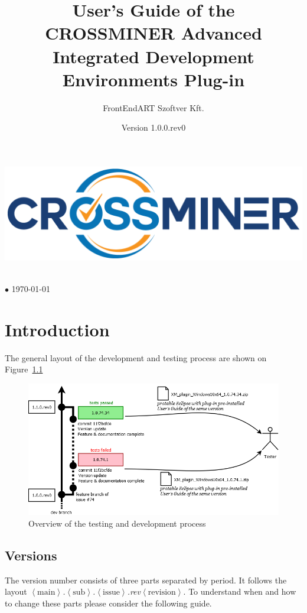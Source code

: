 \documentclass[11pt,a4paper]{book}
\author{FrontEndART Szoftver Kft.}
\title{User's Guide of the CROSSMINER Advanced Integrated Development Environments Plug-in}
\date{Version 1.0.0.rev0}
\makeatletter
\renewcommand{\maketitle}{
\vspace*{.1\textheight}
\begin{center}
	\includegraphics[width=.6\textwidth]{pic/CROSSMINER-logo-large.png}
\end{center}
\begin{center}
	\Huge\@title
\end{center}
\vfill
\begin{center}
	\large\@author\\\@date{} $\bullet$ \today
\end{center}
}
\newcommand{\placeholder}[1]{$\left\langle\text{#1}\right\rangle$}
\makeatother
\begin{document}
	
\begin{titlepage}
	\maketitle
\end{titlepage}

\chapter{Introduction}

The general layout of the development and testing process are shown on Figure~\ref{fig:version}

\begin{figure}[h]
	\centering
	\includegraphics[width=\linewidth]{pic/version.png}
	\caption{Overview of the testing and development process}
	\label{fig:version}
\end{figure}


\section{Versions}
The version number consists of three parts separated by period. It follows the layout \emph{\placeholder{main}.\placeholder{sub}.\placeholder{issue}.rev\placeholder{revision}}. To understand when and how to change these parts please consider the following guide.
\end{document}
